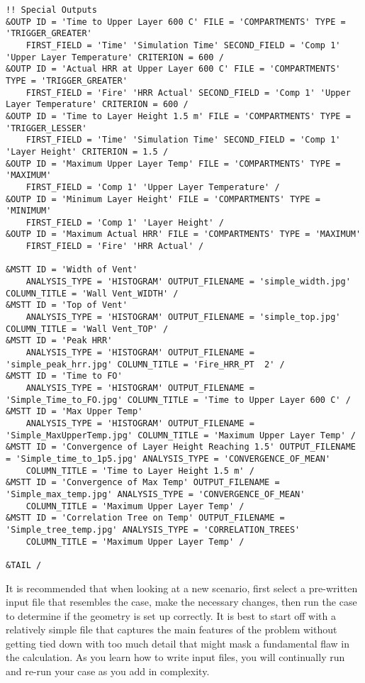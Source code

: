 \begin{lstlisting}[basicstyle=\tiny]
!! Special Outputs
&OUTP ID = 'Time to Upper Layer 600 C' FILE = 'COMPARTMENTS' TYPE = 'TRIGGER_GREATER'
    FIRST_FIELD = 'Time' 'Simulation Time' SECOND_FIELD = 'Comp 1' 'Upper Layer Temperature' CRITERION = 600 /
&OUTP ID = 'Actual HRR at Upper Layer 600 C' FILE = 'COMPARTMENTS' TYPE = 'TRIGGER_GREATER'
    FIRST_FIELD = 'Fire' 'HRR Actual' SECOND_FIELD = 'Comp 1' 'Upper Layer Temperature' CRITERION = 600 /
&OUTP ID = 'Time to Layer Height 1.5 m' FILE = 'COMPARTMENTS' TYPE = 'TRIGGER_LESSER'
    FIRST_FIELD = 'Time' 'Simulation Time' SECOND_FIELD = 'Comp 1' 'Layer Height' CRITERION = 1.5 /
&OUTP ID = 'Maximum Upper Layer Temp' FILE = 'COMPARTMENTS' TYPE = 'MAXIMUM'
    FIRST_FIELD = 'Comp 1' 'Upper Layer Temperature' /
&OUTP ID = 'Minimum Layer Height' FILE = 'COMPARTMENTS' TYPE = 'MINIMUM'
    FIRST_FIELD = 'Comp 1' 'Layer Height' /
&OUTP ID = 'Maximum Actual HRR' FILE = 'COMPARTMENTS' TYPE = 'MAXIMUM'
    FIRST_FIELD = 'Fire' 'HRR Actual' /

&MSTT ID = 'Width of Vent'
    ANALYSIS_TYPE = 'HISTOGRAM' OUTPUT_FILENAME = 'simple_width.jpg' COLUMN_TITLE = 'Wall Vent_WIDTH' /
&MSTT ID = 'Top of Vent'
    ANALYSIS_TYPE = 'HISTOGRAM' OUTPUT_FILENAME = 'simple_top.jpg' COLUMN_TITLE = 'Wall Vent_TOP' /
&MSTT ID = 'Peak HRR'
    ANALYSIS_TYPE = 'HISTOGRAM' OUTPUT_FILENAME = 'simple_peak_hrr.jpg' COLUMN_TITLE = 'Fire_HRR_PT  2' /
&MSTT ID = 'Time to FO'
    ANALYSIS_TYPE = 'HISTOGRAM' OUTPUT_FILENAME = 'Simple_Time_to_FO.jpg' COLUMN_TITLE = 'Time to Upper Layer 600 C' /
&MSTT ID = 'Max Upper Temp'
    ANALYSIS_TYPE = 'HISTOGRAM' OUTPUT_FILENAME = 'Simple_MaxUpperTemp.jpg' COLUMN_TITLE = 'Maximum Upper Layer Temp' /
&MSTT ID = 'Convergence of Layer Height Reaching 1.5' OUTPUT_FILENAME = 'Simple_time_to_1p5.jpg' ANALYSIS_TYPE = 'CONVERGENCE_OF_MEAN'
    COLUMN_TITLE = 'Time to Layer Height 1.5 m' /
&MSTT ID = 'Convergence of Max Temp' OUTPUT_FILENAME = 'Simple_max_temp.jpg' ANALYSIS_TYPE = 'CONVERGENCE_OF_MEAN'
    COLUMN_TITLE = 'Maximum Upper Layer Temp' /
&MSTT ID = 'Correlation Tree on Temp' OUTPUT_FILENAME = 'Simple_tree_temp.jpg' ANALYSIS_TYPE = 'CORRELATION_TREES'
    COLUMN_TITLE = 'Maximum Upper Layer Temp' /

&TAIL /
\end{lstlisting}
It is recommended that when looking at a new scenario, first select a pre-written input file that resembles the case, make the necessary changes, then run the case to determine if the geometry is set up correctly. It is best to start off with a relatively simple file that captures the main features of the problem without getting tied down with too much detail that might mask a fundamental flaw in the calculation. As you learn how to write input files, you will continually run and re-run your case as you add in complexity.

